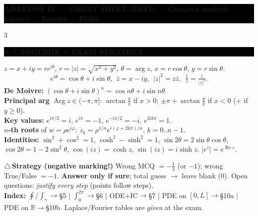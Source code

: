 \documentclass[a4paper,8pt]{extarticle}
\providecommand{\smaller}{\footnotesize}
\newcommand{\topic}[2]{%
  \vspace{4.5pt}%
  {\colorbox{#1}{\parbox{\dimexpr\columnwidth-2\fboxsep}{\color{white}\bfseries\footnotesize #2}}}\par\vspace{2.5pt}}
\newcommand{\warn}{\textcolor{cWarn}{\textbf{\textwarning\,}}}
\newcommand{\textwarning}{$\triangle$}
\newcommand{\R}{\mathbb{R}}
\renewcommand{\Re}{\operatorname{Re}}
\newcommand{\Arg}{\operatorname{Arg}}
\newcommand{\To}{\!\to\!}
\begin{document}
{\centering
\colorbox{black}{\parbox{\dimexpr\textwidth-2\fboxsep}{\color{white}\centering\bfseries\large
ANALYSIS IV — CHEAT SHEET \;\small\mdseries(EPFL) \;·\; Complex analysis · Laplace · Fourier · PDEs}}\par}
\vspace{2pt}

\begin{multicols}{3}
\smaller

\topic{black}{0. $\mathbb{C}$ TOOLBOX + EXAM STRATEGY}
$z=x+iy=re^{i\theta}$, $r=|z|=\sqrt{x^2+y^2}$, $\theta=\arg z$, $x=r\cos\theta$, $y=r\sin\theta$.
\[ e^{i\theta}=\cos\theta+i\sin\theta,\ \ \overline z=x-iy,\ \ |z|^2=z\bar z,\ \ \tfrac1z=\tfrac{\bar z}{|z|^2}.\]
\textbf{De Moivre:} $(\cos\theta+i\sin\theta)^n=\cos n\theta+i\sin n\theta$.\\
\textbf{Principal arg} $\Arg z\in(-\pi,\pi]$: $\arctan\frac yx$ if $x{>}0$; $\pm\pi{+}\arctan\frac yx$ if $x{<}0$ ($+$ if $y{\geq}0$).\\
\textbf{Key values:} $e^{i\pi/2}{=}i$, $e^{i\pi}{=}{-}1$, $e^{-i\pi/2}{=}{-}i$, $e^{2ik\pi}{=}1$.\\
\textbf{$n$-th roots} of $w=\rho e^{i\varphi}$: $z_k=\rho^{1/n}e^{i(\varphi+2k\pi)/n}$, $k{=}0..n{-}1$.\\
\textbf{Identities:} $\sin^2{+}\cos^2{=}1$, $\cosh^2{-}\sinh^2{=}1$, $\sin2\theta{=}2\sin\theta\cos\theta$, $\cos2\theta{=}1{-}2\sin^2\theta$, $\cos(iz){=}\cosh z$, $\sin(iz){=}i\sinh z$, $|e^z|{=}e^{\Re z}$.
\begin{tip}
\warn\textbf{Strategy (negative marking!)} Wrong MCQ $=-\tfrac13$ (or $-1$); wrong True/False $=-1$. \textbf{Answer only if sure}; total guess $\to$ leave blank ($0$). Open questions: \emph{justify every step} (points follow steps).\\
\textbf{Index:} $\oint/\int_\gamma\To$\S5 \;|\; $\int_0^{2\pi}\To$\S6 \;|\; ODE+IC$\To$\S7 \;|\; PDE on $[0,L]\To$\S10a \;|\; PDE on $\R\To$\S10b. Laplace/Fourier tables are \emph{given} at the exam.
\end{tip}


\end{multicols}
\end{document}
